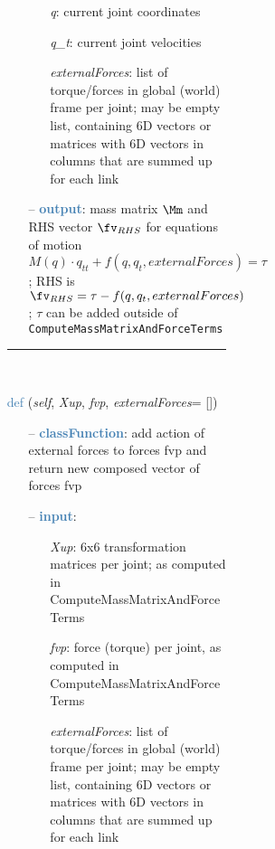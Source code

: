 \begin{itemize}[leftmargin=1.4cm]
\begin{itemize}[leftmargin=1.4cm]
\begin{itemize}[leftmargin=0.5cm]
\begin{itemize}[leftmargin=1.4cm]
\begin{itemize}[leftmargin=1.4cm]
\begin{itemize}[leftmargin=0.5cm]
\begin{itemize}[leftmargin=1.4cm]
\begin{itemize}[leftmargin=0.5cm]
\begin{itemize}[leftmargin=1.4cm]
\begin{itemize}[leftmargin=1.4cm]
\begin{itemize}[leftmargin=1.4cm]
\begin{itemize}[leftmargin=0.7cm]
\begin{itemize}[leftmargin=1.2cm]
\setlength{\itemindent}{-0.7cm}
\item[]{\it q}: current joint coordinates
\item[]{\it q\_t}: current joint velocities
\item[]{\it externalForces}: list of torque/forces in global (world) frame per joint; may be empty list, containing 6D vectors or matrices with 6D vectors in columns that are summed up for each link
\end{itemize}
\item[--]\textcolor{steelblue}{\bf output}: mass matrix $\Mm$ and RHS vector $\fv_{RHS}$ for equations of motion $M(q) \cdot q_{tt} + f(q,q_t,externalForces) = \tau$; RHS is $\fv_{RHS}=\tau - f(q,q_t,externalForces)$; $\tau$ can be added outside of \texttt{ComputeMassMatrixAndForceTerms}
\vspace{12pt}\end{itemize}
%
\noindent\rule{8cm}{0.75pt}\vspace{1pt} \\ 
\begin{flushleft}
\noindent \textcolor{steelblue}{def {\bf {}}}\label{sec:kinematicTree:KinematicTree66:AddExternalForces}
({\it self}, {\it Xup}, {\it fvp}, {\it externalForces}= [])
\end{flushleft}
\setlength{\itemindent}{0.7cm}
\begin{itemize}[leftmargin=0.7cm]
\item[--]\textcolor{steelblue}{\bf classFunction}: add action of external forces to forces fvp and return new composed vector of forces fvp
\item[--]\textcolor{steelblue}{\bf input}: \vspace{-6pt}
\begin{itemize}[leftmargin=1.2cm]
\setlength{\itemindent}{-0.7cm}
\item[]{\it Xup}: 6x6 transformation matrices per joint; as computed in ComputeMassMatrixAndForceTerms
\item[]{\it fvp}: force (torque) per joint, as computed in ComputeMassMatrixAndForceTerms
\item[]{\it externalForces}: list of torque/forces in global (world) frame per joint; may be empty list, containing 6D vectors or matrices with 6D vectors in columns that are summed up for each link
\end{itemize}

\end{itemize}
\end{itemize}
\end{itemize}
\end{itemize}
\end{itemize}
\end{itemize}
\end{itemize}
\end{itemize}
\end{itemize}
\end{itemize}
\end{itemize}
\end{itemize}
